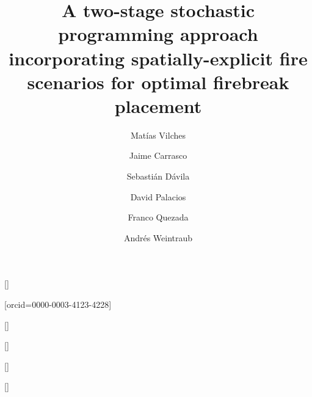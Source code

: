 \documentclass[a4paper,fleqn]{cas-sc}
\begin{document}
\let\WriteBookmarks\relax
\def\floatpagepagefraction{1}
\def\textpagefraction{.001}

\title [mode = title]{A two-stage stochastic programming approach incorporating spatially-explicit fire scenarios for optimal firebreak placement} 

\author[2]{Mat\'ias Vilches}[]


\author[1,5]{Jaime Carrasco}[orcid=0000-0003-4123-4228]
\cormark[1]


\author[2,4]{Sebastián Dávila}[]


\author[5]{David Palacios}[]


\author[2,4]{Franco Quezada}[]


\author[3,5]{Andr\'es Weintraub}[]


\address[1]{Departamento de Industria, Facultad de Ingenier\'ia, Universidad Tecnol\'ogica Metropolitana, Santiago, Chile}

\address[2]{University of Santiago of Chile (USACH), Faculty of Engineering, Industrial Engineering Department, Santiago, Chile}

\address[3]{Industrial Engineering Department, University of Chile, Santiago, Chile}

\address[4]{University of Santiago of Chile (USACH), Faculty of Engineering, Program for the Development of Sustainable Production Systems (PDSPS)}

\address[5]{Complex Engineering System Institute - ISCI, Santiago, Chile}


\maketitle
\end{document}
